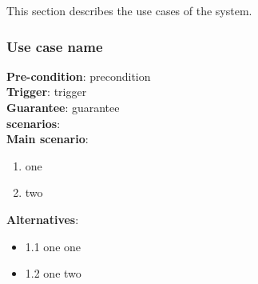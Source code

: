 This section describes the use cases of the system.

\subsubsection{Use case name}
\textbf{Pre-condition}: precondition\\
\textbf{Trigger}: trigger\\
\textbf{Guarantee}: guarantee\\
\textbf{scenarios}:\\
\hangindent=0.5cm 	\textbf{Main scenario}:
					\begin{enumerate}
						\item one
						\item two
					\end{enumerate}
\hangindent=0.5cm 	\textbf{Alternatives}:
					\begin{itemize}
						\item 1.1 one one
						\item 1.2 one two
					\end{itemize}

